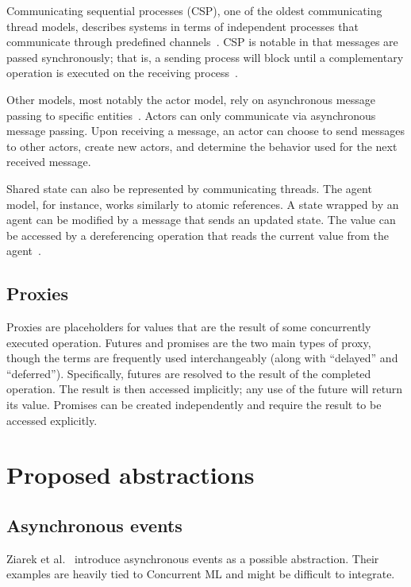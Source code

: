 \documentclass{sig-alternate}
\begin{document}
Communicating sequential processes (CSP), one of the oldest communicating thread models, describes systems in terms of independent processes that communicate through predefined channels~\cite{Hoare1978}. CSP is notable in that messages are passed synchronously; that is, a sending process will block until a complementary operation is executed on the receiving process~\cite{Swalens2014}.

Other models, most notably the actor model, rely on asynchronous message passing to specific entities~\cite{Agha1986}. Actors can only communicate via asynchronous message passing. Upon receiving a message, an actor can choose to send messages to other actors, create new actors, and determine the behavior used for the next received message.

Shared state can also be represented by communicating threads. The agent model, for instance, works similarly to atomic references. A state wrapped by an agent can be modified by a message that sends an updated state. The value can be accessed by a dereferencing operation that reads the current value from the agent~\cite{Swalens2014}.

\subsection{Proxies}

Proxies are placeholders for values that are the result of some concurrently executed operation. Futures and promises are the two main types of proxy, though the terms are frequently used interchangeably (along with ``delayed'' and ``deferred''). Specifically, futures are resolved to the result of the completed operation. The result is then accessed implicitly; any use of the future will return its value. Promises can be created independently and require the result to be accessed explicitly.

\section{Proposed abstractions}

\subsection{Asynchronous events}

Ziarek et al.~\cite{Ziarek2011} introduce asynchronous events as a possible abstraction. Their examples are heavily tied to Concurrent ML and might be difficult to integrate.
\end{document}

